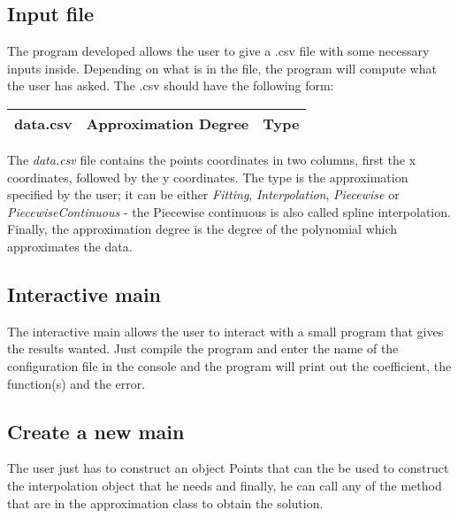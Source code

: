 \documentclass[12pt]{article}
\begin{document}
\subsection{Input file}
The program developed allows the user to give a .csv file with some necessary inputs inside. Depending on what is in the file, the program will compute what the user has asked. The .csv should have the following form:\\
\begin{center}
\begin{tabular}{|c|c|c|}
\hline
data.csv & Approximation Degree & Type  \\
\hline
\end{tabular} 
\end{center}
The \emph{data.csv} file contains the points coordinates in two columns, first the x coordinates, followed by the y coordinates. The type is the approximation specified by the user; it can be either \emph{Fitting}, \emph{Interpolation}, \emph{Piecewise} or \emph{PiecewiseContinuous} - the Piecewise continuous is also called spline interpolation. Finally, the approximation degree is the degree of the polynomial which approximates the data.\\

\subsection{Interactive main}
The interactive main allows the user to interact with a small program that gives the results wanted. Just compile the program and enter the name of the configuration file in the console and the program will print out the coefficient, the function(s) and the error.

\subsection{Create a new main}
The user just has to construct an object Points that can the be used to construct the interpolation object that he needs and finally, he can call any of the method that are in the approximation class to obtain the solution.
\end{document}
